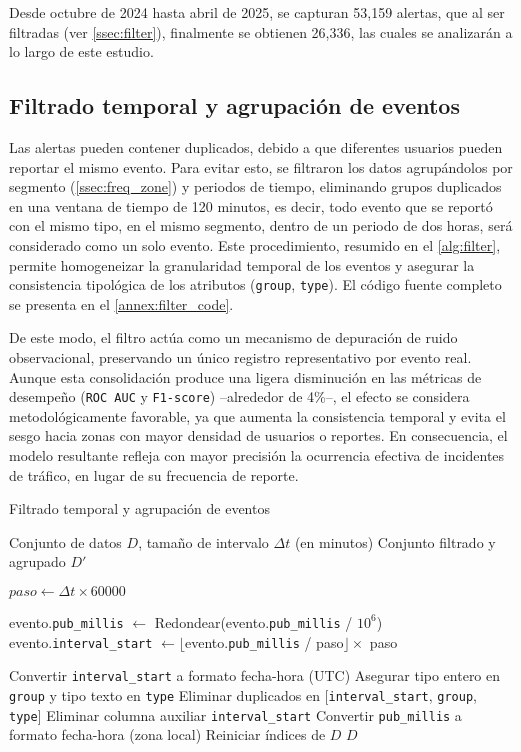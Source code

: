 \documentclass[12pt]{article}
\begin{document}
Desde octubre de 2024 hasta abril de 2025, se capturan 53,159 alertas, que al ser filtradas (ver \autoref{ssec:filter}), finalmente se obtienen 26,336, las cuales se analizarán a lo largo de este estudio.


\subsection{Filtrado temporal y agrupación de eventos} \label{ssec:filter}

Las alertas pueden contener duplicados, debido a que diferentes usuarios pueden reportar el mismo evento. Para evitar esto, se filtraron los datos agrupándolos por segmento (\autoref{ssec:freq_zone}) y periodos de tiempo, eliminando grupos duplicados en una ventana de tiempo de 120 minutos, es decir, todo evento que se reportó con el mismo tipo, en el mismo segmento, dentro de un periodo de dos horas, será considerado como un solo evento. Este procedimiento, resumido en el \autoref{alg:filter}, permite homogeneizar la granularidad temporal de los eventos y asegurar la consistencia tipológica de los atributos (\texttt{group}, \texttt{type}). El código fuente completo se presenta en el \autoref{annex:filter_code}.

De este modo, el filtro actúa como un mecanismo de depuración de ruido observacional, preservando un único registro representativo por evento real. Aunque esta consolidación produce una ligera disminución en las métricas de desempeño (\texttt{ROC AUC} y \texttt{F1-score}) –alrededor de 4\%–, el efecto se considera metodológicamente favorable, ya que aumenta la consistencia temporal y evita el sesgo hacia zonas con mayor densidad de usuarios o reportes. En consecuencia, el modelo resultante refleja con mayor precisión la ocurrencia efectiva de incidentes de tráfico, en lugar de su frecuencia de reporte.


\begin{algorithm}[H]
\caption{Filtrado temporal y agrupación de eventos}
\label{alg:filter}
\begin{algorithmic}[1]
\Require Conjunto de datos $D$, tamaño de intervalo $\Delta t$ (en minutos)
\Ensure Conjunto filtrado y agrupado $D'$

\State $paso \gets \Delta t \times 60000$ 

        \State evento.\texttt{pub\_millis} $\gets$ Redondear(evento.\texttt{pub\_millis} / $10^6$)
    \EndIf
    \State evento.\texttt{interval\_start} $\gets \lfloor$evento.\texttt{pub\_millis} / paso$\rfloor \times$ paso
\EndFor

\State Convertir \texttt{interval\_start} a formato fecha-hora (UTC)
\State Asegurar tipo entero en \texttt{group} y tipo texto en \texttt{type}
\State Eliminar duplicados en [\texttt{interval\_start}, \texttt{group}, \texttt{type}]
\State Eliminar columna auxiliar \texttt{interval\_start}
\State Convertir \texttt{pub\_millis} a formato fecha-hora (zona local)
\State Reiniciar índices de $D$
\State \Return $D$
\end{algorithmic}
\end{algorithm}
\end{document}
